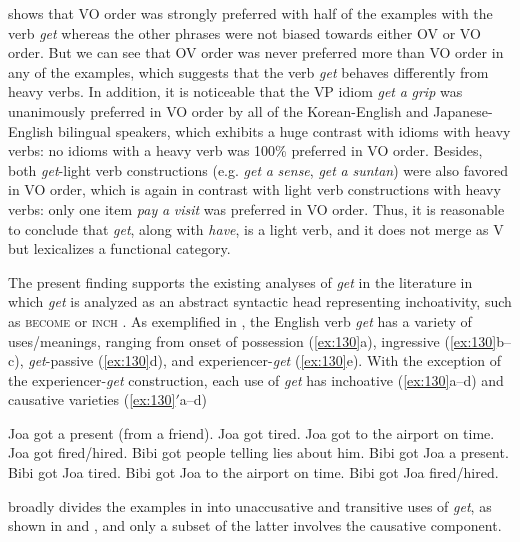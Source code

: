  shows that \ac{VO} order was strongly preferred with half of the examples with the verb \textit{get} whereas the other phrases were not biased towards either \ac{OV} or \ac{VO} order. But we can see that \ac{OV} order was never preferred more than \ac{VO} order in any of the examples, which suggests that the verb \textit{get} behaves differently from heavy verbs. In addition, it is noticeable that the \acs{VP} idiom \textit{get} \textit{a} \textit{grip} was unanimously preferred in \ac{VO} order by all of the Korean-English and Japanese-English bilingual speakers, which exhibits a huge contrast with idioms with heavy verbs:  no idioms with a heavy verb was 100\% preferred in \ac{VO} order. Besides, both \textit{get}{}-light verb constructions (e.g. \textit{get} \textit{a} \textit{sense}, \textit{get} \textit{a} \textit{suntan}) were also favored in \ac{VO} order, which is again in contrast with light verb constructions with heavy verbs: only one item \textit{pay} \textit{a} \textit{visit} was preferred in \ac{VO} order. Thus, it is reasonable to conclude that \textit{get}, along with \textit{have}, is a light verb, and it does not merge as V but lexicalizes a functional category.


The present finding supports the existing analyses of \textit{get} in the literature in which \textit{get} is analyzed as an abstract syntactic head representing inchoativity, such as \textsc{become} \citep{McIntyre2005a} or \textsc{inch} \citep{Shim2006}. As exemplified in , the English verb \textit{get} has a variety of uses/meanings, ranging from onset of possession (\ref{ex:130}a), ingressive (\ref{ex:130}b--c), \textit{get}-passive (\ref{ex:130}d), and experiencer-\textit{get} (\ref{ex:130}e). With the exception of the experiencer-\textit{get} construction, each use of \textit{get} has inchoative (\ref{ex:130}a--d) and causative varieties (\ref{ex:130}$'$a--d)

\ea\label{ex:130}
    \ea Joa got a present (from a friend).	
    \ex Joa got tired.
    \ex Joa got to the airport on time. 
    \ex Joa got fired/hired. 
    \ex Bibi got people telling lies about him.
    \z
{}
    \ea Bibi got Joa a present.
    \ex Bibi got Joa tired.
    \ex Bibi got Joa to the airport on time.
    \ex Bibi got Joa fired/hired.
    \z
\z


\citet{McIntyre2005a} broadly divides the examples in  into unaccusative and transitive uses of \textit{get}, as shown in  and , and only a subset of the latter involves the causative component. 

